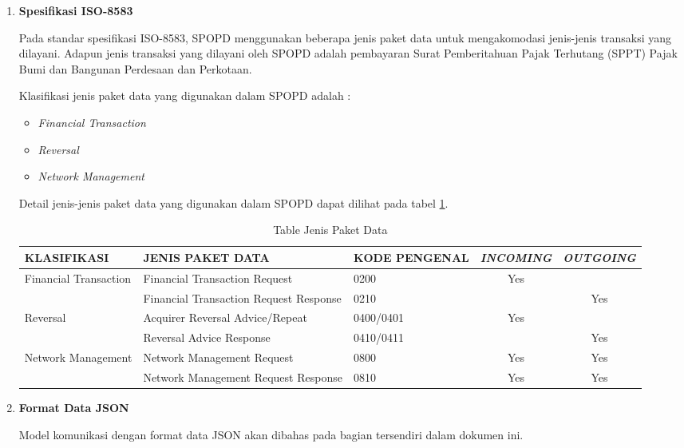 \begin{enumerate}[1.]

\item \textbf{Spesifikasi ISO-8583}

Pada standar spesifikasi ISO-8583, SPOPD menggunakan beberapa jenis paket data untuk mengakomodasi jenis-jenis transaksi yang dilayani. Adapun jenis transaksi yang dilayani oleh SPOPD adalah pembayaran Surat Pemberitahuan Pajak Terhutang (SPPT) Pajak Bumi dan Bangunan Perdesaan dan Perkotaan.

Klasifikasi jenis paket data yang digunakan dalam SPOPD adalah : 

\begin{itemize}
  \item \textit{Financial Transaction}
  \item \textit{Reversal}
  \item \textit{Network Management}
\end{itemize}

Detail jenis-jenis paket data yang digunakan dalam SPOPD dapat dilihat pada tabel \ref{tab:jenis-paket-data}. 

\begin{table}[H]
\centering
\begin{tabular}{| l | p{4cm} | p{2cm} | c | c |}
  \hline
  \rowcolor{lightgray} KLASIFIKASI & JENIS PAKET DATA & KODE PENGENAL & \textit{INCOMING} & \textit{OUTGOING} \\
  \hline  
  \multirow{2}{4em}{Financial Transaction} & Financial Transaction Request & 0200 & Yes & \\
  \cline{2-5}
  & Financial Transaction Request Response & 0210 & & Yes \\
  \hline
  \multirow{2}{4em}{Reversal} & Acquirer Reversal Advice/Repeat & 0400/0401 & Yes & \\
  \cline{2-5}
  & Reversal Advice Response & 0410/0411 & & Yes \\
  \hline
  \multirow{2}{4em}{Network Management} & Network Management Request & 0800 & Yes & Yes \\
  \cline{2-5}
  & Network Management Request Response & 0810 & Yes & Yes \\
  \hline
\end{tabular}
  \caption{Table Jenis Paket Data}
  \label{tab:jenis-paket-data}
\end{table}

\item \textbf{Format Data JSON}

Model komunikasi dengan format data JSON akan dibahas pada bagian tersendiri dalam dokumen ini.

\end{enumerate}